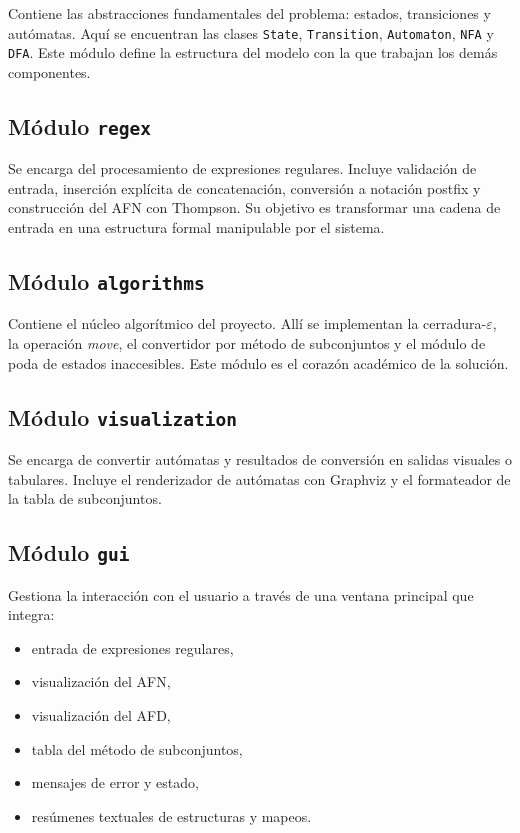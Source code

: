 \documentclass[12pt]{article}
\begin{document}
Contiene las abstracciones fundamentales del problema: estados, transiciones y autómatas. Aquí se encuentran las clases \texttt{State}, \texttt{Transition}, \texttt{Automaton}, \texttt{NFA} y \texttt{DFA}. Este módulo define la estructura del modelo con la que trabajan los demás componentes.

\subsection{Módulo \texttt{regex}}

Se encarga del procesamiento de expresiones regulares. Incluye validación de entrada, inserción explícita de concatenación, conversión a notación postfix y construcción del AFN con Thompson. Su objetivo es transformar una cadena de entrada en una estructura formal manipulable por el sistema.

\subsection{Módulo \texttt{algorithms}}

Contiene el núcleo algorítmico del proyecto. Allí se implementan la cerradura-$\varepsilon$, la operación \textit{move}, el convertidor por método de subconjuntos y el módulo de poda de estados inaccesibles. Este módulo es el corazón académico de la solución.

\subsection{Módulo \texttt{visualization}}

Se encarga de convertir autómatas y resultados de conversión en salidas visuales o tabulares. Incluye el renderizador de autómatas con Graphviz y el formateador de la tabla de subconjuntos.

\subsection{Módulo \texttt{gui}}

Gestiona la interacción con el usuario a través de una ventana principal que integra:
\begin{itemize}
    \item entrada de expresiones regulares,
    \item visualización del AFN,
    \item visualización del AFD,
    \item tabla del método de subconjuntos,
    \item mensajes de error y estado,
    \item resúmenes textuales de estructuras y mapeos.
\end{itemize}
\end{document}
